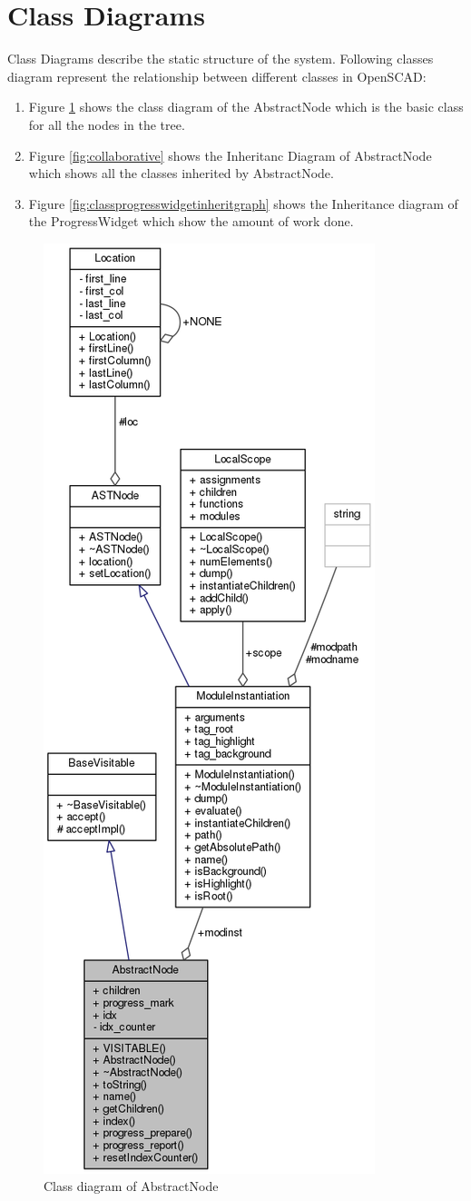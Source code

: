 \section{Class Diagrams}
Class Diagrams describe the static structure of the system. Following classes diagram represent the relationship between different classes in OpenSCAD:
\begin{enumerate}
	\item Figure \ref{fig:classabstractnodecollgraph} shows the class diagram of the AbstractNode which is the basic class for all the nodes in the tree.
	\item Figure \ref{fig:collaborative} shows the Inheritanc Diagram of AbstractNode which shows all the classes inherited by AbstractNode.
	\item Figure \ref{fig:classprogresswidgetinheritgraph}  shows the Inheritance diagram of the ProgressWidget which show the amount of work done.
\end{enumerate}

\begin{figure}
\centering
\includegraphics[width=0.5\linewidth]{images/classAbstractNode__coll__graph}
\caption{Class diagram of AbstractNode}
\label{fig:classabstractnodecollgraph}
\end{figure}

